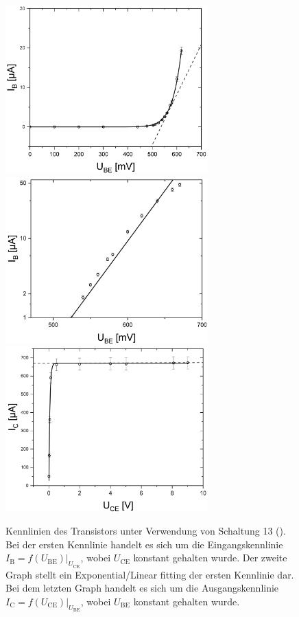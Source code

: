 \documentclass[a4paper,usenatbib]{aspdoc}
\begin{document}
            \begin{figure}
                \centering
                \includegraphics[width=78mm]{graphs/Kennlinie11.png}
                \includegraphics[width=78mm]{graphs/Kennlinie11EXP.png}
                \includegraphics[width=78mm]{graphs/Kennlinie12.png}
                \caption{Kennlinien des Transistors unter Verwendung von Schaltung 13 (\cite{anleitung}). Bei der ersten Kennlinie handelt es sich um die Eingangskennlinie $I_{\mathrm{B}}=\left.f\left(U_{\mathrm{BE}}\right)\right|_{U_{\mathrm{CE}}}$, wobei $U_{\mathrm{CE}}$ konstant gehalten wurde. Der zweite Graph stellt ein Exponential/Linear fitting der ersten Kennlinie dar. Bei dem letzten Graph handelt es sich um die Ausgangskennlinie $I_{\mathrm{C}}=\left.f\left(U_{\mathrm{CE}}\right)\right|_{U_{\mathrm{BE}}}$, wobei $U_{\mathrm{BE}}$ konstant gehalten wurde.}
                \label{fig:kennlinie}
            \end{figure}
            
\end{document}
